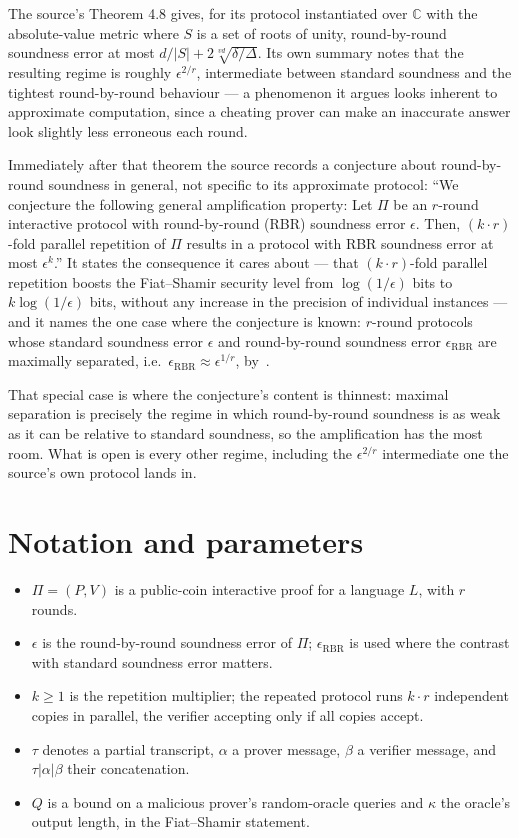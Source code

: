 \documentclass{aicr-conjecture}
\newcommand{\eps}{\epsilon}
\newcommand{\Ver}{V}
\newcommand{\Prov}{P}
\begin{document}
The source's Theorem 4.8 gives, for its protocol instantiated over
$\mathbb{C}$ with the absolute-value metric where $S$ is a set of roots
of unity, round-by-round soundness error at most $d/|S| + 2
\sqrt[vd]{\delta/\Delta}$. Its own summary notes that the resulting
regime is roughly $\eps^{2/r}$, intermediate between standard soundness
and the tightest round-by-round behaviour --- a phenomenon it argues
looks inherent to approximate computation, since a cheating prover can
make an inaccurate answer look slightly less erroneous each round.

Immediately after that theorem the source records a conjecture about
round-by-round soundness in general, not specific to its approximate
protocol: ``We conjecture the following general amplification property:
Let $\Pi$ be an $r$-round interactive protocol with round-by-round (RBR)
soundness error $\eps$. Then, $(k \cdot r)$-fold parallel repetition of
$\Pi$ results in a protocol with RBR soundness error at most
$\eps^{k}$.'' It states the consequence it cares about --- that $(k \cdot
r)$-fold parallel repetition boosts the Fiat--Shamir security level from
$\log(1/\eps)$ bits to $k \log(1/\eps)$ bits, without any increase in the
precision of individual instances --- and it names the one case where the
conjecture is known: $r$-round protocols whose standard soundness error
$\eps$ and round-by-round soundness error $\eps_{\mathrm{RBR}}$ are
maximally separated, i.e.\ $\eps_{\mathrm{RBR}} \approx \eps^{1/r}$,
by~\cite[Corollary 5.7]{CCH+18}.

That special case is where the conjecture's content is thinnest: maximal
separation is precisely the regime in which round-by-round soundness is
as weak as it can be relative to standard soundness, so the amplification
has the most room. What is open is every other regime, including the
$\eps^{2/r}$ intermediate one the source's own protocol lands in.

\section{Notation and parameters}\label{sec:notation}

\begin{itemize}[nosep]
  \item $\Pi = (\Prov, \Ver)$ is a public-coin interactive proof for a
    language $L$, with $r$ rounds.
  \item $\eps$ is the round-by-round soundness error of $\Pi$;
    $\eps_{\mathrm{RBR}}$ is used where the contrast with standard
    soundness error matters.
  \item $k \ge 1$ is the repetition multiplier; the repeated protocol
    runs $k \cdot r$ independent copies in parallel, the verifier
    accepting only if all copies accept.
  \item $\tau$ denotes a partial transcript, $\alpha$ a prover message,
    $\beta$ a verifier message, and $\tau | \alpha | \beta$ their
    concatenation.
  \item $Q$ is a bound on a malicious prover's random-oracle queries and
    $\kappa$ the oracle's output length, in the Fiat--Shamir statement.
\end{itemize}
\end{document}
